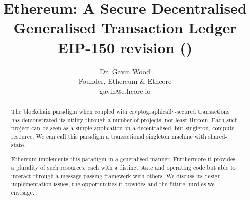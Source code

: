 \documentclass[9pt,oneside]{amsart}
\title{Ethereum: A Secure Decentralised Generalised Transaction Ledger \\ {\smaller \textbf{EIP-150 revision (\YellowPaperVersionNumber{})}}}
\author{
    Dr. Gavin Wood\\
    Founder, Ethereum \& Ethcore\\
    gavin@ethcore.io
}
\begin{document}
\pagecolor{lightyellow}

\begin{abstract}
The blockchain paradigm when coupled with cryptographically-secured transactions has demonstrated its utility through a number of projects, not least Bitcoin. Each such project can be seen as a simple application on a decentralised, but singleton, compute resource. We can call this paradigm a transactional singleton machine with shared-state.

Ethereum implements this paradigm in a generalised manner. Furthermore it provides a plurality of such resources, each with a distinct state and operating code but able to interact through a message-passing framework with others. We discuss its design, implementation issues, the opportunities it provides and the future hurdles we envisage.
\end{abstract}

\maketitle
\end{document}
